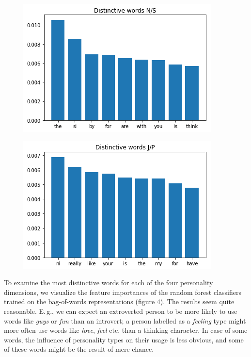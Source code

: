 \documentclass[12pt]{elsarticle}
\begin{document}
\begin{figure}[ht]
\begin{minipage}{0.48\textwidth}
  \centering
  {\includegraphics[width=.9\linewidth]{img/words_ns.png}}
\end{minipage}
\begin{minipage}{0.48\textwidth}
  \centering
  {\includegraphics[width=.9\linewidth]{img/words_jp.png}}
\end{minipage}
\end{figure}
To examine the most distinctive words for each of the four personality dimensions, we visualize the feature importances of the random forest classifiers trained on the bag-of-words representations (figure 4). The results seem quite reasonable. E.\,g., we can expect an extroverted person to be more likely to use words like \textit{guys} or \textit{fun} than an introvert; a person labelled as a \textit{feeling} type might more often use words like \textit{love}, \textit{feel} etc. than a thinking character. In case of some words, the influence of personality types on their usage is less obvious, and some of these words might be the result of mere chance.
\end{document}
